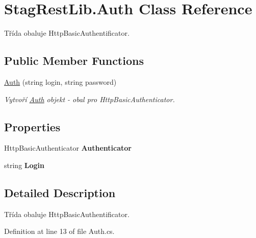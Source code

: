 \hypertarget{class_stag_rest_lib_1_1_auth}{}\section{Stag\+Rest\+Lib.\+Auth Class Reference}
\label{class_stag_rest_lib_1_1_auth}


Třída obaluje Http\+Basic\+Authentificator.  


\subsection*{Public Member Functions}
\begin{DoxyCompactItemize}
\item 
\hyperlink{class_stag_rest_lib_1_1_auth_a0f259ec6ee35c07ebd181136775dec90}{Auth} (string login, string password)
\begin{DoxyCompactList}\small\item\em Vytvoří \hyperlink{class_stag_rest_lib_1_1_auth}{Auth} objekt -\/ obal pro Http\+Basic\+Authenticator. \end{DoxyCompactList}\end{DoxyCompactItemize}
\subsection*{Properties}
\begin{DoxyCompactItemize}
\item 
\mbox{\label{class_stag_rest_lib_1_1_auth_a277ba5760ba67e87e2ac28ed8a615111}} 
Http\+Basic\+Authenticator {\bfseries Authenticator}
\item 
\mbox{\label{class_stag_rest_lib_1_1_auth_abf756ebd16386cfe70be2faa4d4e1f78}} 
string {\bfseries Login}
\end{DoxyCompactItemize}


\subsection{Detailed Description}
Třída obaluje Http\+Basic\+Authentificator. 



Definition at line 13 of file Auth.\+cs.



